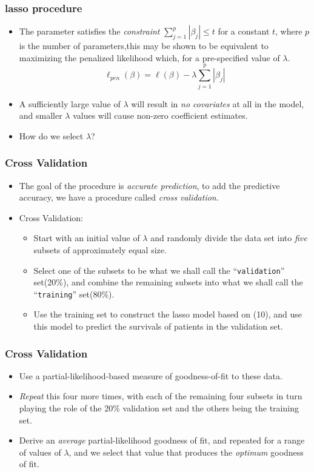 \documentclass{beamer}
\newcommand{\empr}[1]{{\emph{\color{red}#1}}}
\begin{document}
\pagebreak
\begin{frame}
\frametitle{lasso procedure}
\begin{itemize}
\item The parameter satisfies the \empr{constraint} $\sum_{j=1}^{p}|\beta_j|\le t$ for a constant $t$, where $p$ is the number of parameters,this may be shown to be equivalent to maximizing the penalized likelihood which, for a pre-specified value of $\lambda$.
\begin{equation}
\ell_{pen}(\beta) = \ell(\beta) - \lambda \sum\limits_{j=1}^{p}|\beta_j|
\end{equation}
\item A sufficiently large value of $\lambda$ will result in \empr{no covariates} at all in the model, and smaller $\lambda$ values will cause non-zero coefficient estimates.
\item How do we select $\lambda$?
\end{itemize}
\end{frame}

\pagebreak
\begin{frame}
\frametitle{Cross Validation}
\begin{itemize}
\item The goal of the procedure is \empr{accurate prediction}, to add the predictive accuracy, we have a procedure called \empr{cross validation}.
\item Cross Validation:
\begin{itemize}
\item Start with an initial value of $\lambda$ and randomly divide the data set into \empr{five} subsets of approximately equal size.
\item Select one of the subsets to be what we shall call the ``\texttt{validation}'' set(20\%), and combine the remaining subsets into what we shall call the ``\texttt{training}'' set(80\%).
\item Use the training set to construct the lasso model based on (10), and use this model to predict the survivals of patients in the validation set.
\end{itemize}
\end{itemize}
\end{frame}

\pagebreak
\begin{frame}
\frametitle{Cross Validation}
\begin{itemize}
\item Use a partial-likelihood-based measure of goodness-of-fit to these data.
\item \empr{Repeat} this four more times, with each of the remaining four subsets in turn playing the role of the 20\% validation set and the others being the training set.
\item Derive an \empr{average} partial-likelihood goodness of fit, and  repeated for a range of values of $\lambda$, and we select that value that produces the \empr{optimum} goodness of fit.
\end{itemize}
\end{frame}
\end{document}
